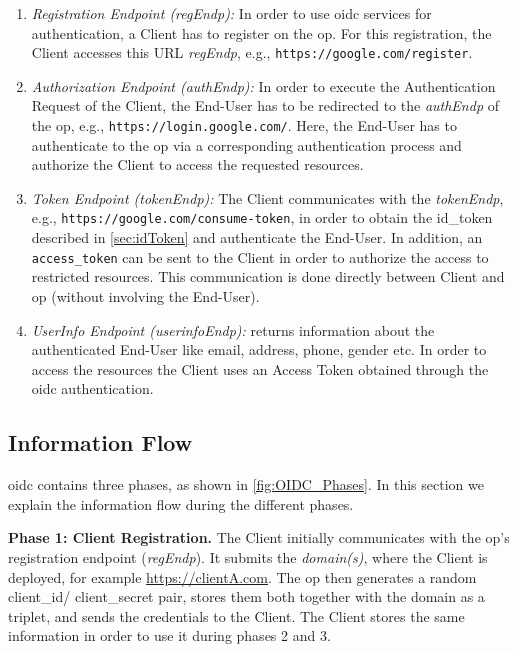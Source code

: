 \documentclass[conference,compsoc]{IEEEtran}
\renewcommand*{\paragraph}[1]{\vspace{2mm}\noindent\textbf{#1.}}
\begin{document}
\begin{enumerate}
 \item \emph{Registration Endpoint (regEndp):}
 In order to use \gls{oidc} services for authentication, a Client has to register on the \gls{op}.
 For this registration, the Client accesses this URL \emph{regEndp}, e.g., \texttt{https://google.com/register}.

 \item \emph{Authorization Endpoint (authEndp):}
 In order to execute the Authentication Request of the Client, the End-User has to be redirected to the \emph{authEndp} of the \gls{op}, e.g., \texttt{https://login.google.com/}.
 Here, the End-User has to authenticate to the \gls{op} via a corresponding authentication process and authorize the Client to access the requested resources.

 \item \emph{Token Endpoint (tokenEndp):}
 The Client communicates with the \emph{tokenEndp}, e.g., \texttt{https://google.com/consume-token}, in order to obtain the \gls{id_token} described in \autoref{sec:idToken} and authenticate the End-User. In addition, an \texttt{access\_token} can be sent to the Client in order to authorize the access to restricted resources.
 This communication is done directly between Client and \gls{op} (without involving the End-User).

 \item \emph{UserInfo Endpoint (userinfoEndp):} returns information about the authenticated End-User like email, address, phone, gender etc. In order to access the resources the Client uses an Access Token obtained through the \gls{oidc} authentication.
\end{enumerate}

\subsection{Information Flow}

\gls{oidc} contains three phases, as shown in \autoref{fig:OIDC_Phases}.
In this section we explain the information flow during the different phases.

\paragraph{Phase 1: Client Registration}
The Client initially communicates with the \gls{op}'s registration endpoint (\emph{regEndp}).
It submits the \emph{domain(s)}, where the Client is deployed, for example \url{https://clientA.com}.
The \gls{op} then generates a random \gls{client_id}/ \gls{client_secret} pair, stores them both together with the domain as a triplet, and sends the credentials to the Client. The Client stores the same information in order to use it during phases 2 and 3.
\end{document}
